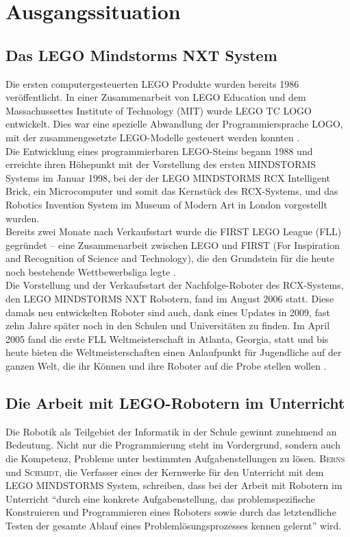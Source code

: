 \documentclass[paper=a4, pagesize, DIV=calc, BCOR=12.5mm, twoside=on, onecolumn=on, open = any, titlepage =on, parskip =half-, headsepline = on, footsepline = on, chapterprefix = on, appendixprefix = off, fontsize = 12pt, numbers = noenddot, abstract = on]{scrbook}
\numberwithin{equation}{chapter}
\theoremstyle{definition}
\theoremstyle{plain}
\theoremstyle{plain}
\theoremstyle{remark}
\theoremstyle{plain}
\theoremstyle{plain}
\begin{document}
\chapter{Ausgangssituation}

\par\singlespacing
\section{Das LEGO Mindstorms NXT System}
\onehalfspacing
Die ersten computergesteuerten LEGO Produkte wurden bereits 1986 veröffentlicht. In einer Zusammenarbeit von LEGO Education und dem Massachussettes Institute of Technology (MIT) wurde LEGO TC LOGO entwickelt. Dies war eine spezielle Abwandlung der Programmiersprache LOGO, mit der zusammengesetzte LEGO-Modelle gesteuert werden konnten \cite{rolling:14}.\\
Die Entwicklung eines programmierbaren LEGO-Steins begann 1988 und erreichte ihren Höhepunkt mit der Vorstellung des ersten MINDSTORMS Systems im Januar 1998, bei der der LEGO MINDSTORMS RCX Intelligent Brick, ein Microcomputer und somit das Kernstück des RCX-Systems, und das Robotics Invention System im Museum of Modern Art in London vorgestellt wurden.\\
Bereits zwei Monate nach Verkaufsstart wurde die FIRST LEGO League (FLL) gegründet -- eine Zusammenarbeit zwischen LEGO und FIRST (For Inspiration and Recognition of Science and Technology), die den Grundstein für die heute noch bestehende Wettbewerbsliga legte \cite{rolling:14}.\\
Die Vorstellung und der Verkaufsstart der Nachfolge-Roboter des RCX-Systems, den LEGO MINDSTORMS NXT Robotern, fand im August 2006 statt. Diese damals neu entwickelten Roboter sind auch, dank eines Updates in 2009, fast zehn Jahre später noch in den Schulen und Universitäten zu finden. Im April 2005 fand die erste FLL Weltmeisterschaft in Atlanta, Georgia, statt und bis heute bieten die Weltmeisterschaften einen Anlaufpunkt für Jugendliche auf der ganzen Welt, die ihr Können und ihre Roboter auf die Probe stellen wollen \cite{lego}.

\par \singlespacing
\section{Die Arbeit mit LEGO-Robotern im Unterricht}
\onehalfspacing
Die Robotik als Teilgebiet der Informatik in der Schule gewinnt zunehmend an Bedeutung. Nicht nur die Programmierung steht im Vordergrund, sondern auch die Kompetenz, Probleme unter bestimmten Aufgabenstellungen zu lösen. \textsc{Berns} und \textsc{Schmidt}, die Verfasser eines der Kernwerke für den Unterricht mit dem LEGO MINDSTORMS System, schreiben, dass bei der Arbeit mit Robotern im Unterricht "`durch eine konkrete Aufgabenstellung, das problemspezifische Konstruieren und Programmieren eines Roboters sowie durch das letztendliche Testen der gesamte Ablauf eines Problemlösungsprozesses kennen gelernt"' \cite[S.2]{berns:10} wird.\\
\end{document}
